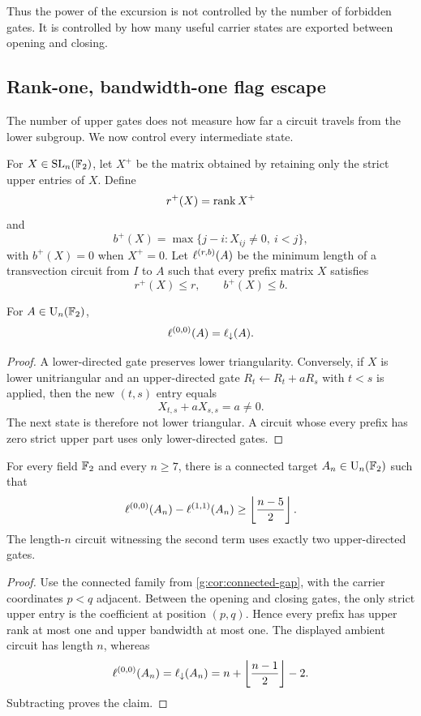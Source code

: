 Thus the power of the excursion is not controlled by the number of forbidden gates.  It is controlled by how many useful carrier states are exported between opening and closing.

\subsection{Rank-one, bandwidth-one flag escape}\label{g:subsec:microscopic-escape}

The number of upper gates does not measure how far a circuit travels from the lower subgroup.  We now control every intermediate state.

For $X\in\operatorname{SL}_n(\mathbb F_2)$, let $X^+$ be the matrix obtained by retaining only the strict upper entries of $X$.  Define
\[
r^+(X)=\operatorname{rank} X^+
\]
and
\[
b^+(X)=\max\{j-i:X_{ij}\ne0,\ i<j\},
\]
with $b^+(X)=0$ when $X^+=0$.  Let $\ell^{(r,b)}(A)$ be the minimum length of a transvection circuit from $I$ to $A$ such that every prefix matrix $X$ satisfies
\[
r^+(X)\le r,
\qquad
b^+(X)\le b.
\]

\begin{lemma}\label{g:lem:zero-excursion-equals-lower}
For $A\in\operatorname{U}_n(\mathbb F_2)$,
\[
\ell^{(0,0)}(A)=\ell_{\downarrow}(A).
\]
\end{lemma}

\begin{proof}
A lower-directed gate preserves lower triangularity.  Conversely, if $X$ is lower unitriangular and an upper-directed gate $R_t\leftarrow R_t+aR_s$ with $t<s$ is applied, then the new $(t,s)$ entry equals
\[
X_{t,s}+aX_{s,s}=a\ne0.
\]
The next state is therefore not lower triangular.  A circuit whose every prefix has zero strict upper part uses only lower-directed gates.
\end{proof}

\begin{theorem}\label{g:thm:microscopic-escape}
For every field $\mathbb F_2$ and every $n\ge7$, there is a connected target $A_n\in\operatorname{U}_n(\mathbb F_2)$ such that
\[
\ell^{(0,0)}(A_n)-\ell^{(1,1)}(A_n)
\ge
\left\lfloor\frac{n-5}{2}\right\rfloor.
\]
The length-$n$ circuit witnessing the second term uses exactly two upper-directed gates.
\end{theorem}

\begin{proof}
Use the connected family from \cref{g:cor:connected-gap}, with the carrier coordinates $p<q$ adjacent.  Between the opening and closing gates, the only strict upper entry is the coefficient at position $(p,q)$.  Hence every prefix has upper rank at most one and upper bandwidth at most one.  The displayed ambient circuit has length $n$, whereas
\[
\ell^{(0,0)}(A_n)=\ell_{\downarrow}(A_n)
=n+\left\lfloor\frac{n-1}{2}\right\rfloor-2.
\]
Subtracting proves the claim.
\end{proof}

